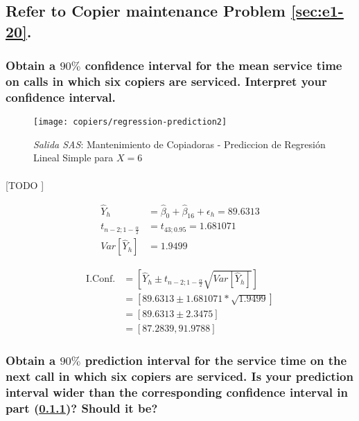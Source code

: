 \documentclass{article}
\begin{document}
    \setcounter{subsection}{13}
    \subsection{Refer to \textbf{Copier maintenance} Problem \ref{sec:e1-20}.}

      \subsubsection{Obtain a $90\%$ confidence interval for the mean service time on calls in which six copiers are serviced. Interpret your confidence interval.}
      \label{sec:copiers-2.14a}


      \begin{figure}[!h]
        \centering
        \texttt{[image: copiers/regression-prediction2]}
        \caption{\emph{Salida SAS}: Mantenimiento de Copiadoras - Prediccion de Regresión Lineal Simple para $X = 6$}
        \label{img:copiers-regression-prediction2}
      \end{figure}

        \paragraph{}
        [TODO ]

        \begin{align}
          \widehat{Y}_h &= \widehat{\beta}_0 +\widehat{\beta}_16+ \epsilon_h = 89.6313\\
          t_{n-2;1-\frac{\alpha}{2}} &= t_{43;0.95} = 1.681071\\
          Var\left[\widehat{Y}_h \right]  &= 1.9499
        \end{align}

        \begin{equation}
          \begin{split}
            \text{I.Conf.} &= \left[\widehat{Y}_h \pm t_{n-2;1-\frac{\alpha}{2}}\sqrt{Var\left[\widehat{Y}_h \right]}\right] \\
            &= \left[89.6313 \pm 1.681071 * \sqrt{1.9499}\right] \\
            &= \left[89.6313 \pm 2.3475\right] \\
            &= \left[87.2839, 91.9788\right]
          \end{split}
        \end{equation}

      \subsubsection{Obtain a $90\%$ prediction interval for the service time on the next call in which six copiers are serviced. Is your prediction interval wider than the corresponding confidence interval in part (\ref{sec:copiers-2.14a})? Should it be?}
\end{document}
